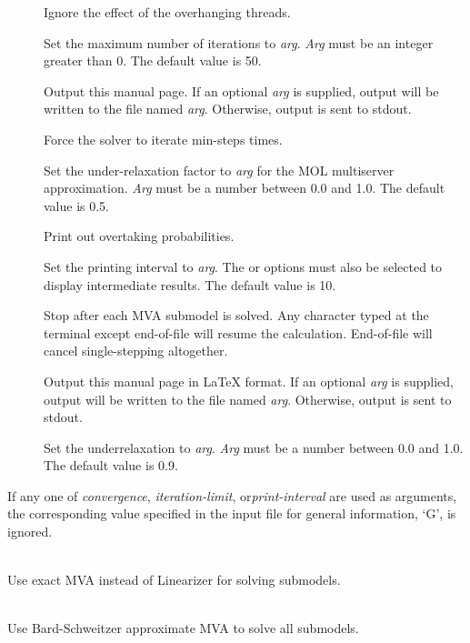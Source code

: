 \begin{description}
\begin{description}
\item[]
Ignore the effect of the overhanging threads.
\item[]
Set the maximum number of iterations to \emph{arg}.
\emph{Arg} must be an integer greater than 0.  The default value is 50.
\item[]
Output this manual page.  
If an optional \emph{arg}
is supplied, output will be written to the file named \emph{arg}.
Otherwise, output is sent to stdout.
\item[]
Force the solver to iterate min-steps times.
\item[]
Set the under-relaxation factor to \emph{arg} for the MOL multiserver approximation.
\emph{Arg} must be a number between 0.0 and 1.0.
The default value is 0.5.\item[]
Print out overtaking probabilities.
\item[]
Set the printing interval to \emph{arg}.
The  or  options must also be selected to display intermediate results.
The default value is 10.
\item[]
Stop after each MVA submodel is solved.
Any character typed at the terminal except end-of-file will resume the calculation.  End-of-file will cancel single-stepping altogether.
\item[]
Output this manual page in LaTeX format.
If an optional \emph{arg}
is supplied, output will be written to the file named \emph{arg}.
Otherwise, output is sent to stdout.
\item[]
Set the underrelaxation to \emph{arg}.
\emph{Arg} must be a number between 0.0 and 1.0.
The default value is 0.9.
\end{description}
If any one of \emph{convergence}, \emph{iteration-limit}, or\emph{print-interval} are used as arguments, the corresponding 
value specified in the input file for general information, `G', is
ignored.  
\item[\longopt{exact-mva}]~\\
Use exact MVA instead of Linearizer for solving submodels.
\item[\longopt{schweitzer}]~\\
Use Bard-Schweitzer approximate MVA to solve all submodels.

\end{description}
